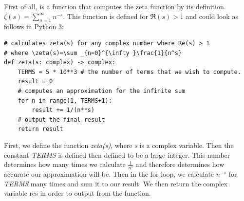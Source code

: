 \documentclass[12pt]{article}
\begin{document}
First of all, is a function that computes the zeta function by its definition. $\zeta(s) = \sum_{n=1}^{\infty} n^{-s}$. This function is defined for $\Re(s) > 1$ and could look as follows in Python 3:

\begin{lstlisting}
# calculates zeta(s) for any complex number where Re(s) > 1
# where \zeta(s)=\sum _{n=0}^{\infty }\frac{1}{n^s}
def zeta(s: complex) -> complex:
    TERMS = 5 * 10**3 # the number of terms that we wish to compute.
    result = 0
    # computes an approximation for the infinite sum
    for n in range(1, TERMS+1):
        result += 1/(n**s)
    # output the final result
    return result
\end{lstlisting}

First, we define the function \textit{zeta(s)}, where \textit{s} is a complex variable. Then the constant \textit{TERMS} is defined then defined to be a large integer. This number determines how many times we calculate $\frac{1}{n^s}$ and therefore determines how accurate our approximation will be. Then in the for loop, we calculate $n^{-s}$ for \textit{TERMS} many times and sum it to our result. We then return the complex variable res in order to output from the function.
\end{document}
